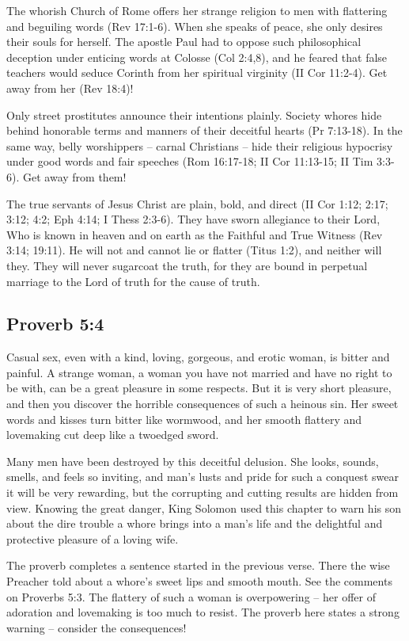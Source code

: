 The whorish Church of Rome offers her strange religion to men with flattering and beguiling words (Rev 17:1-6). When she speaks of peace, she only desires their souls for herself. The apostle Paul had to oppose such philosophical deception under enticing words at Colosse (Col 2:4,8), and he feared that false teachers would seduce Corinth from her spiritual virginity (II Cor 11:2-4). Get away from her (Rev 18:4)!

Only street prostitutes announce their intentions plainly. Society whores hide behind honorable terms and manners of their deceitful hearts (Pr 7:13-18). In the same way, belly worshippers – carnal Christians – hide their religious hypocrisy under good words and fair speeches (Rom 16:17-18; II Cor 11:13-15; II Tim 3:3-6). Get away from them!

The true servants of Jesus Christ are plain, bold, and direct (II Cor 1:12; 2:17; 3:12; 4:2; Eph 4:14; I Thess 2:3-6). They have sworn allegiance to their Lord, Who is known in heaven and on earth as the Faithful and True Witness (Rev 3:14; 19:11). He will not and cannot lie or flatter (Titus 1:2), and neither will they. They will never sugarcoat the truth, for they are bound in perpetual marriage to the Lord of truth for the cause of truth.

\subsection{Proverb 5:4}
Casual sex, even with a kind, loving, gorgeous, and erotic woman, is bitter and painful. A strange woman, a woman you have not married and have no right to be with, can be a great pleasure in some respects. But it is very short pleasure, and then you discover the horrible consequences of such a heinous sin. Her sweet words and kisses turn bitter like wormwood, and her smooth flattery and lovemaking cut deep like a twoedged sword.

Many men have been destroyed by this deceitful delusion. She looks, sounds, smells, and feels so inviting, and man’s lusts and pride for such a conquest swear it will be very rewarding, but the corrupting and cutting results are hidden from view. Knowing the great danger, King Solomon used this chapter to warn his son about the dire trouble a whore brings into a man’s life and the delightful and protective pleasure of a loving wife.

The proverb completes a sentence started in the previous verse. There the wise Preacher told about a whore’s sweet lips and smooth mouth. See the comments on Proverbs 5:3. The flattery of such a woman is overpowering – her offer of adoration and lovemaking is too much to resist. The proverb here states a strong warning – consider the consequences!

